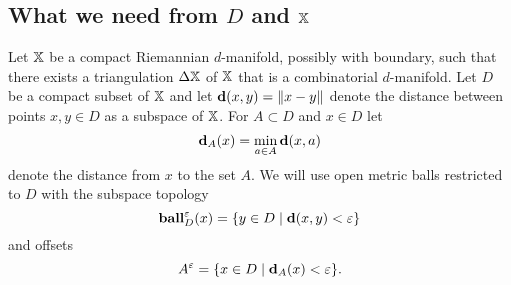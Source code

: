 
%


\subsection{What we need from $D$ and $\mathbb{X}$}

Let $\mathbb{X}$ be a compact Riemannian $d$-manifold, possibly with boundary, such that there exists a triangulation $\Delta \mathbb{X}$ of $\mathbb{X}$ that is a combinatorial $d$-manifold.
Let $D$ be a compact subset of $\mathbb{X}$ and let $\mathbf{d}(x, y) = \|x - y\|$ denote the distance between points $x,y\in D$ as a subspace of $\mathbb{X}$.
For $A\subset D$ and $x\in D$ let
\[\mathbf{d}_A(x) = \min_{a\in A}\mathbf{d}(x, a)\]
denote the distance from $x$ to the set $A$.
We will use open metric balls restricted to $D$ with the subspace topology
\[\mathbf{ball}_D^\varepsilon(x) = \{y\in D\mid \mathbf{d}(x, y) < \varepsilon\}\]
and offsets
\[A^\varepsilon = \{x\in D\mid \mathbf{d}_A(x) < \varepsilon\}.\]

